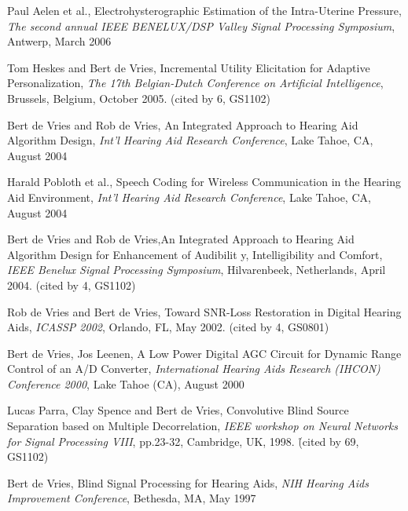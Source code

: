 \begin{etaremune}
\item Paul Aelen et al., Electrohysterographic Estimation of the Intra-Uterine Pressure, \emph{The second annual
IEEE BENELUX/DSP Valley Signal Processing Symposium}, Antwerp, March 2006

\item Tom Heskes and Bert de Vries, Incremental Utility Elicitation for Adaptive
Personalization, \emph{The 17th Belgian-Dutch Conference on Artificial Intelligence}, Brussels, Belgium, October 2005. (cited by 6, GS1102)

\item Bert de Vries and Rob de Vries, An Integrated Approach to Hearing Aid Algorithm Design, \emph{Int'l Hearing Aid Research Conference},
Lake Tahoe, CA, August 2004

\item Harald Pobloth et al., Speech Coding for Wireless Communication
in the Hearing Aid Environment, \emph{Int'l Hearing Aid Research Conference},
Lake Tahoe, CA, August 2004

\item Bert de Vries and Rob de Vries,An Integrated Approach to Hearing
Aid Algorithm Design for Enhancement of Audibilit y,
Intelligibility and Comfort, \emph{IEEE Benelux Signal Processing
Symposium}, Hilvarenbeek, Netherlands, April 2004. (cited by 4, GS1102)

\item Rob de Vries and Bert de Vries, Toward SNR-Loss Restoration in Digital Hearing Aids, {\em ICASSP 2002}, Orlando, FL, May 2002. (cited by 4, GS0801)

\item Bert de Vries, Jos Leenen, A Low Power Digital AGC Circuit for
Dynamic Range Control of an A/D Converter, {\em International
Hearing Aids Research (IHCON) Conference 2000}, Lake Tahoe (CA),
August 2000


\item Lucas Parra, Clay Spence and Bert de Vries, Convolutive Blind Source
Separation based on Multiple Decorrelation, {\em IEEE workshop on Neural
Networks for Signal Processing VIII}, pp.23-32, Cambridge, UK, 1998. \r{(cited by 69, GS1102)}

\item Bert de Vries, Blind Signal Processing for Hearing Aids, {\em NIH Hearing Aids Improvement Conference}, Bethesda, MA, May 1997


\end{etaremune}
